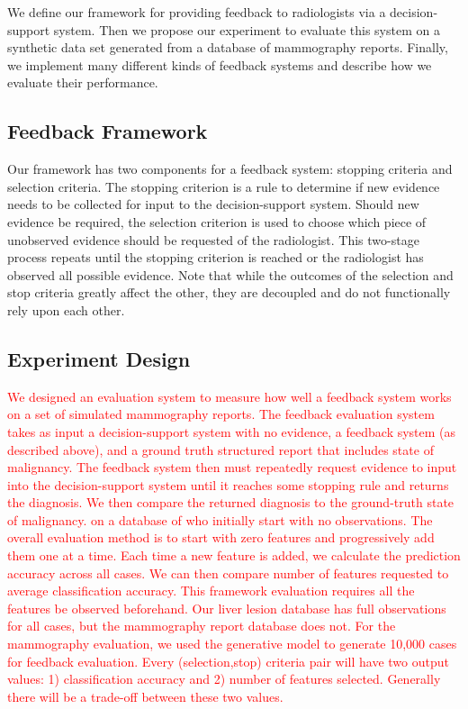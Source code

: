 We define our framework for providing feedback to radiologists via a decision-support system. Then we propose our experiment to evaluate this system on a synthetic data set generated from a database of mammography reports. Finally, we implement many different kinds of feedback systems and describe how we evaluate their performance.

\subsection{Feedback Framework}
Our framework has two components for a feedback system: stopping criteria and selection criteria. The stopping criterion is a rule to determine if new evidence needs to be collected for input to the decision-support system. Should new evidence be required, the selection criterion is used to choose which piece of unobserved evidence should be requested of the radiologist. This two-stage process repeats until the stopping criterion is reached or the radiologist has observed all possible evidence. Note that while the outcomes of the selection and stop criteria greatly affect the other, they are decoupled and do not functionally rely upon each other. 

\subsection{Experiment Design}
\textcolor{red}{We designed an evaluation system to measure how well a feedback system works on a set of simulated mammography reports. 
The feedback evaluation system takes as input a decision-support system with no evidence, a feedback system (as described above), and a ground truth structured report that includes state of malignancy. The feedback system then must repeatedly request evidence to input into the decision-support system until it reaches some stopping rule and returns the diagnosis. We then compare the returned diagnosis to the ground-truth state of malignancy.
on a database of 
who initially start with no observations. 
The overall evaluation method is to start with zero features and progressively add them one at a time. Each time a new feature is added, we calculate the prediction accuracy across all cases. We can then compare number of features requested to average classification accuracy.
This framework evaluation requires all the features be observed beforehand. Our liver lesion database has full observations for all cases, but the mammography report database does not. For the mammography evaluation, we used the generative model to generate 10,000 cases for feedback evaluation.
Every (selection,stop) criteria pair will have two output values: 1) classification accuracy and 2) number of features selected. Generally there will be a trade-off between these two values. }


